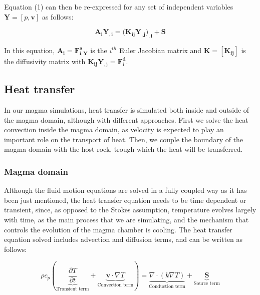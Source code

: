 Equation (1) can then be re-expressed for any set of independent variables $\boldsymbol{Y} = [p,\mathbf{v}]$ as follows:


\begin{equation}
	\boldsymbol{A_iY_{,i}} = (\boldsymbol{K_{ij}Y_{,j})_{,i} + S}
\end{equation}


In this equation, $\boldsymbol{A_i = F^{a}_{i,Y}}$ is the $i^{th}$ Euler Jacobian matrix and $\boldsymbol{K = [K_{ij}]}$ is the diffusivity matrix with $\boldsymbol{K_{ij}Y_{,j} = F^{d}_{i}}$.

\subsection{Heat transfer}
In our magma simulations, heat transfer is simulated both inside and outside of the magma domain, although with different approaches. First we solve the heat convection inside the magma domain, as velocity is expected to play an important role on the transport of heat. Then, we couple the boundary of the magma domain with the host rock, trough which the heat will be transferred.

\subsubsection{Magma domain}
Although the fluid motion equations are solved in a fully coupled way as it has been just mentioned, the heat transfer equation needs to be time dependent or transient, since, as opposed to the Stokes assumption, temperature evolves largely with time, as the main process that we are simulating, and the mechanism that controls the evolution of the magma chamber is cooling. The heat transfer equation solved includes advection and diffusion terms, and can be written as follows:

\begin{equation}
	\rho c_p \left(\underbrace{\frac{\partial T}{\partial t}}_{\text{Transient term}} + \underbrace{\mathbf{v} \cdot \nabla T }_{\text{Convection term}}\right) = \underbrace{\nabla \cdot (k \nabla T)}_{\text{Conduction term}} + \underbrace{\mathbf{S}}_{\text{Source term}}
\end{equation}


